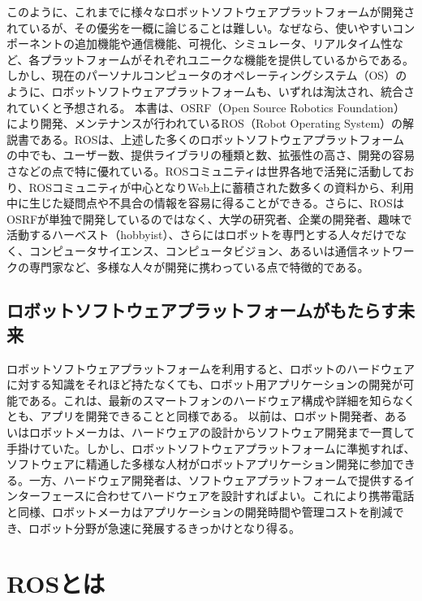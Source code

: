 このように、これまでに様々なロボットソフトウェアプラットフォームが開発されているが、その優劣を一概に論じることは難しい。なぜなら、使いやすいコンポーネントの追加機能や通信機能、可視化、シミュレータ、リアルタイム性など、各プラットフォームがそれぞれユニークな機能を提供しているからである。しかし、現在のパーソナルコンピュータのオペレーティングシステム（OS）のように、ロボットソフトウェアプラットフォームも、いずれは淘汰され、統合されていくと予想される。
本書は、OSRF（Open Source Robotics Foundation）により開発、メンテナンスが行われているROS（Robot Operating System）の解説書である。ROSは、上述した多くのロボットソフトウェアプラットフォームの中でも、ユーザー数、提供ライブラリの種類と数、拡張性の高さ、開発の容易さなどの点で特に優れている。ROSコミュニティは世界各地で活発に活動しており、ROSコミュニティが中心となりWeb上に蓄積された数多くの資料から、利用中に生じた疑問点や不具合の情報を容易に得ることができる。さらに、ROSはOSRFが単独で開発しているのではなく、大学の研究者、企業の開発者、趣味で活動するハーベスト（hobbyist）、さらにはロボットを専門とする人々だけでなく、コンピュータサイエンス、コンピュータビジョン、あるいは通信ネットワークの専門家など、多様な人々が開発に携わっている点で特徴的である。

\subsection{ロボットソフトウェアプラットフォームがもたらす未来}

ロボットソフトウェアプラットフォームを利用すると、ロボットのハードウェアに対する知識をそれほど持たなくても、ロボット用アプリケーションの開発が可能である。これは、最新のスマートフォンのハードウェア構成や詳細を知らなくとも、アプリを開発できることと同様である。
以前は、ロボット開発者、あるいはロボットメーカは、ハードウェアの設計からソフトウェア開発まで一貫して手掛けていた。しかし、ロボットソフトウェアプラットフォームに準拠すれば、ソフトウェアに精通した多様な人材がロボットアプリケーション開発に参加できる。一方、ハードウェア開発者は、ソフトウェアプラットフォームで提供するインターフェースに合わせてハードウェアを設計すればよい。これにより携帯電話と同様、ロボットメーカはアプリケーションの開発時間や管理コストを削減でき、ロボット分野が急速に発展するきっかけとなり得る。

\section{ROSとは}

